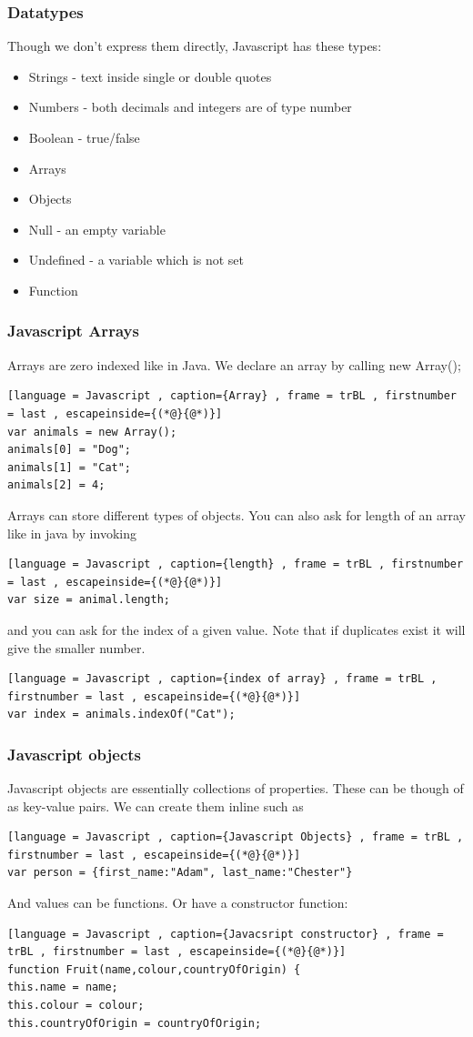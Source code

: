 \documentclass[a4paper]{article}
\theoremstyle{plain}
\theoremstyle{definition}
\theoremstyle{remark}
\begin{document}
\begin{flushleft}
\subsubsection{Datatypes}
Though we don't express them directly, Javascript has these types:
\begin{itemize}
	\item Strings - text inside single or double quotes 
	\item Numbers - both decimals and integers are of type number
	\item Boolean - true/false
	\item Arrays
	\item Objects
	\item Null - an empty variable
	\item Undefined - a variable which is not set
	\item Function
\end{itemize}
\subsubsection{Javascript Arrays}
Arrays are zero indexed like in Java. We declare an array by calling new Array();
\begin{lstlisting}[language = Javascript , caption={Array} , frame = trBL , firstnumber = last , escapeinside={(*@}{@*)}]
var animals = new Array();
animals[0] = "Dog";
animals[1] = "Cat";
animals[2] = 4;
\end{lstlisting}
Arrays can store different types of objects. You can also ask for length of an array like in java by invoking
\begin{lstlisting}[language = Javascript , caption={length} , frame = trBL , firstnumber = last , escapeinside={(*@}{@*)}]
var size = animal.length;
\end{lstlisting}
and you can ask for the index of a given value. Note that if duplicates exist it will give the smaller number.
\begin{lstlisting}[language = Javascript , caption={index of array} , frame = trBL , firstnumber = last , escapeinside={(*@}{@*)}]
var index = animals.indexOf("Cat");
\end{lstlisting}
\subsubsection{Javascript objects}
Javascript objects are essentially collections of properties. These can be though of as key-value pairs. We can create them inline such as
\begin{lstlisting}[language = Javascript , caption={Javascript Objects} , frame = trBL , firstnumber = last , escapeinside={(*@}{@*)}]
var person = {first_name:"Adam", last_name:"Chester"}
\end{lstlisting}
And values can be functions. Or have a constructor function:
\begin{lstlisting}[language = Javascript , caption={Javacsript constructor} , frame = trBL , firstnumber = last , escapeinside={(*@}{@*)}]
function Fruit(name,colour,countryOfOrigin) {
this.name = name;
this.colour = colour;
this.countryOfOrigin = countryOfOrigin;


\end{lstlisting}
\end{flushleft}
\end{document}
